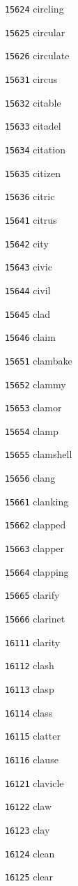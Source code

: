 \documentclass[twoside,11pt]{article}
\begin{document}
\begin{multicols}{5}
\begin{enumerate}
\item[\texttt{15624}] circling
\item[\texttt{15625}] circular
\item[\texttt{15626}] circulate
\item[\texttt{15631}] circus
\item[\texttt{15632}] citable
\item[\texttt{15633}] citadel
\item[\texttt{15634}] citation
\item[\texttt{15635}] citizen
\item[\texttt{15636}] citric
\item[\texttt{15641}] citrus
\item[\texttt{15642}] city
\item[\texttt{15643}] civic
\item[\texttt{15644}] civil
\item[\texttt{15645}] clad
\item[\texttt{15646}] claim
\item[\texttt{15651}] clambake
\item[\texttt{15652}] clammy
\item[\texttt{15653}] clamor
\item[\texttt{15654}] clamp
\item[\texttt{15655}] clamshell
\item[\texttt{15656}] clang
\item[\texttt{15661}] clanking
\item[\texttt{15662}] clapped
\item[\texttt{15663}] clapper
\item[\texttt{15664}] clapping
\item[\texttt{15665}] clarify
\item[\texttt{15666}] clarinet
\item[\texttt{16111}] clarity
\item[\texttt{16112}] clash
\item[\texttt{16113}] clasp
\item[\texttt{16114}] class
\item[\texttt{16115}] clatter
\item[\texttt{16116}] clause
\item[\texttt{16121}] clavicle
\item[\texttt{16122}] claw
\item[\texttt{16123}] clay
\item[\texttt{16124}] clean
\item[\texttt{16125}] clear

\end{enumerate}
\end{multicols}
\end{document}
